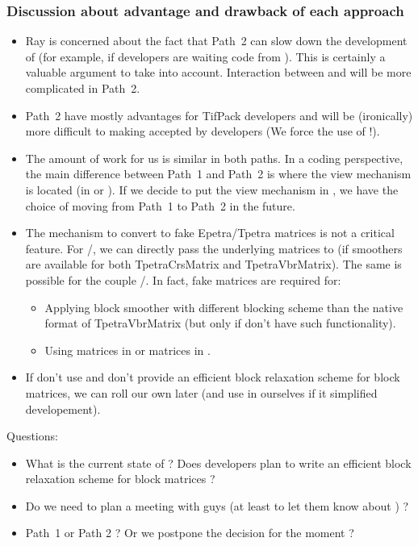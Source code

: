 \subsubsection{Discussion about advantage and drawback of each approach}

\begin{itemize}
\item Ray is concerned about the fact that Path~2 can slow down the development of \muelu (for example, if \Tifpack developers are waiting code from \cthulhu). This is certainly a valuable argument to take into account. Interaction between \mulu and \Tifpack will be more complicated in Path~2.
\item Path~2 have mostly advantages for TifPack developers and will be (ironically) more difficult to making accepted by \Tifpack developers (We force the use of \cthulhu !).
\item The amount of work for us is similar in both paths. In a coding perspective, the main difference between Path~1 and Path~2 is where the view mechanism is located (in \mulu or \cthulhu). 
If we decide to put the view mechanism in \cthulhu, we have the choice of moving from Path~1 to Path~2 in the future.
\item The mechanism to convert \cthulhu to fake Epetra/Tpetra matrices is not a critical feature. For \Tpetra/\Tifpack, we can directly pass the underlying \Tpetra matrices to \Tifpack (if \Tifpack smoothers are available for both TpetraCrsMatrix and TpetraVbrMatrix). The same is possible for the couple \Epetra/\Ifpack. In fact, fake matrices are required for:
\begin{itemize}
\item Applying block smoother with different blocking scheme than the native format of TpetraVbrMatrix (but only if \Tifpack don't have such functionality).
\item Using \Epetra matrices in \Tifpack or \Tpetra matrices in \Ifpack.
\end{itemize}
\item If \Tifpack don't use \cthulhu and don't provide an efficient block relaxation scheme for block matrices, we can roll our own later (and use \cthulhu in \Tifpack ourselves if it simplified developement).
\end{itemize}

Questions:
\begin{itemize}
\item What is the current state of \Tifpack ? Does \Tifpack developers plan to write an efficient block relaxation scheme for block matrices ? 
\item Do we need to plan a meeting with \Tifpack guys (at least to let them know about \cthulhu) ?
\item Path~1 or Path  2 ? Or we postpone the decision for the moment ?
\end{itemize}

